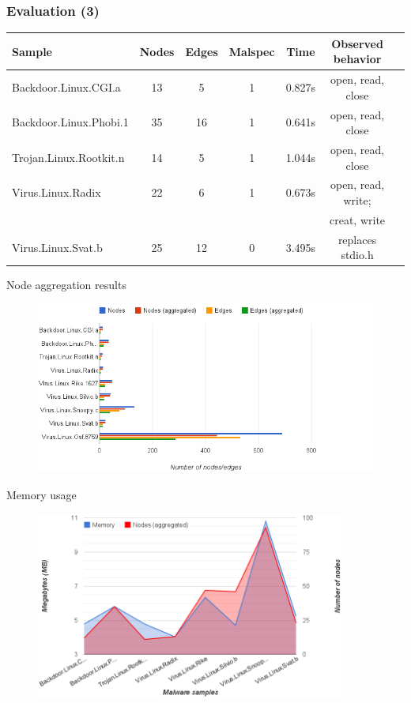 \documentclass{beamer}
\begin{document}
\begin{frame}
  \frametitle{Evaluation (3)}
  \begin{center}
  \scriptsize{
  \begin{tabular}{lcccccc}
    \toprule
    Sample & Nodes & Edges & Malspec & Time & Observed behavior \\
    \midrule
    Backdoor.Linux.CGI.a   & 13  & 5   & 1 & 0.827s  & open, read, close  \\
    Backdoor.Linux.Phobi.1 & 35  & 16  & 1 & 0.641s  & open, read, close  \\
    Trojan.Linux.Rootkit.n & 14  & 5   & 1 & 1.044s  & open, read, close  \\
    Virus.Linux.Radix      & 22  & 6   & 1 & 0.673s  & open, read, write; \\ 
                           &     &     &   &         & creat, write       \\
    Virus.Linux.Svat.b     & 25  & 12  & 0 & 3.495s  & replaces stdio.h   \\
    \bottomrule
  \end{tabular}
  }
  \end{center}
\end{frame}

\begin{frame}{Node aggregation results}
  \begin{figure}[p]
    \includegraphics[width=5in]{img/node-aggregation-android.png}
  \end{figure}
\end{frame}

\begin{frame}{Memory usage}
  \begin{figure}[p]
    \includegraphics[width=4in]{img/mal-memory-use.png}
  \end{figure}
\end{frame}
\end{document}
